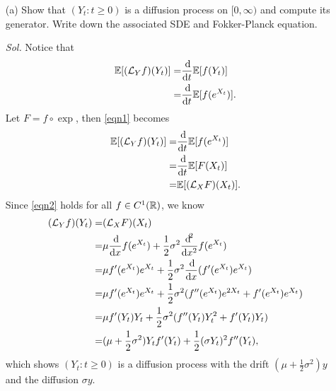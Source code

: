 \begin{enumerate}
    \item[(a)] Show that $(Y_t: t \ge 0)$ is a diffusion process on $[0, \infty)$ and compute its generator. Write down the associated SDE and Fokker-Planck equation.

        \textit{ Sol. } Notice that 
        \begin{align}
            \E[(\mathcal{L}_Yf)(Y_t)] = & \frac{\dif}{\dif t} \E [f(Y_t)] \notag \\ 
            = & \frac{\dif}{\dif t} \E [f(e^{X_t})]. \label{eqn1}
        \end{align}
        Let $F = f \circ \exp$, then \eqref{eqn1} becomes
        \begin{align}
            \E[(\mathcal{L}_Yf)(Y_t)] = & \frac{\dif}{\dif t} \mbb{E} [f(e^{X_t})]  \notag \\ 
            = & \frac{\dif}{\dif t} \mbb{E} [F(X_t)] \notag \\ 
            = & \mbb{E} [(\mathcal{L}_X F)(X_t)]. \label{eqn2}
        \end{align}
        Since \eqref{eqn2} holds for all $f \in C^1(\mathbb{R})$, we know 
        \begin{align}
            (\mathcal{L}_Yf)(Y_t) = & (\mathcal{L}_X F)(X_t) \notag \\ 
            = & \mu \frac{\dif}{\dif x} f(e^{X_t}) + \frac{1}{2} \sigma^2 \frac{\dif ^2}{\dif x^2} f(e^{X_t}) \notag \\ 
            = & \mu f'(e^{X_t}) e^{X_t} + \frac{1}{2} \sigma^2 \frac{\dif}{\dif x} ( f'(e^{X_t})e^{X_t}) \notag \\ 
            = & \mu f'(e^{X_t}) e^{X_t} + \frac{1}{2} \sigma^2 (f''(e^{X_t})e^{2X_t} + f'(e^{X_t}) e^{X_t}) \notag \\ 
            = & \mu f'(Y_t) Y_t + \frac{1}{2}\sigma^2 (f''(Y_t) Y_t^2 + f'(Y_t) Y_t) \notag \\ 
            = & (\mu + \frac{1}{2} \sigma^2)Y_t f'(Y_t) + \frac{1}{2} (\sigma Y_t)^2 f''(Y_t), \label{eqn3}
        \end{align}
        which shows $(Y_t: t \ge 0)$ is a diffusion process with the drift $(\mu + \frac{1}{2}\sigma^2) y$ and the diffusion $\sigma y$.


\end{enumerate}

